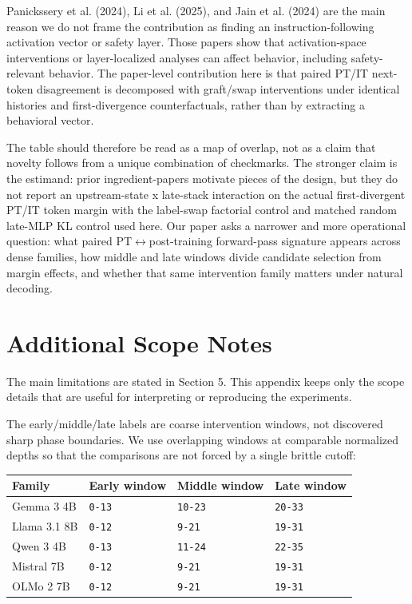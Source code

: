 \documentclass[11pt]{article}
\begin{document}
Panickssery et al. (2024), Li et al. (2025), and Jain et al. (2024) are the main reason we do not frame the contribution as finding an instruction-following activation vector or safety layer. Those papers show that activation-space interventions or layer-localized analyses can affect behavior, including safety-relevant behavior. The paper-level contribution here is that paired PT/IT next-token disagreement is decomposed with graft/swap interventions under identical histories and first-divergence counterfactuals, rather than by extracting a behavioral vector.

The table should therefore be read as a map of overlap, not as a claim that novelty follows from a unique combination of checkmarks. The stronger claim is the estimand: prior ingredient-papers motivate pieces of the design, but they do not report an upstream-state x late-stack interaction on the actual first-divergent PT/IT token margin with the label-swap factorial control and matched random late-MLP KL control used here. Our paper asks a narrower and more operational question: what paired PT\ensuremath{\leftrightarrow}post-training forward-pass signature appears across dense families, how middle and late windows divide candidate selection from margin effects, and whether that same intervention family matters under natural decoding.

\section{Additional Scope Notes}

The main limitations are stated in Section 5. This appendix keeps only the scope details that are useful for interpreting or reproducing the experiments.

The early/middle/late labels are coarse intervention windows, not discovered sharp phase boundaries. We use overlapping windows at comparable normalized depths so that the comparisons are not forced by a single brittle cutoff:

\begin{table}[t]
\centering
\small
\setlength{\tabcolsep}{3pt}
\begin{tabularx}{\linewidth}{@{}>{\raggedright\arraybackslash}X >{\raggedright\arraybackslash}X >{\raggedright\arraybackslash}X >{\raggedright\arraybackslash}X@{}}
\toprule
Family & Early window & Middle window & Late window \\
\midrule
Gemma 3 4B & \texttt{0-13} & \texttt{10-23} & \texttt{20-33} \\
Llama 3.1 8B & \texttt{0-12} & \texttt{9-21} & \texttt{19-31} \\
Qwen 3 4B & \texttt{0-13} & \texttt{11-24} & \texttt{22-35} \\
Mistral 7B & \texttt{0-12} & \texttt{9-21} & \texttt{19-31} \\
OLMo 2 7B & \texttt{0-12} & \texttt{9-21} & \texttt{19-31} \\
\bottomrule
\end{tabularx}
\end{table}
\end{document}
